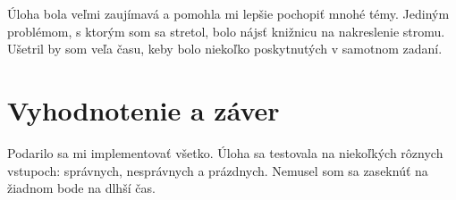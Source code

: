 \documentclass[a4paper,12pt]{article}
\begin{document}
Úloha bola veľmi zaujímavá a pomohla mi lepšie pochopiť mnohé témy. Jediným problémom, s ktorým som sa stretol, bolo nájsť knižnicu na nakreslenie stromu. Ušetril by som veľa času, keby bolo niekoľko poskytnutých v samotnom zadaní.

\section{Vyhodnotenie a záver}

Podarilo sa mi implementovať všetko. Úloha sa testovala na niekoľkých rôznych vstupoch: správnych, nesprávnych a prázdnych. Nemusel som sa zaseknúť na žiadnom bode na dlhší čas.
\end{document}
